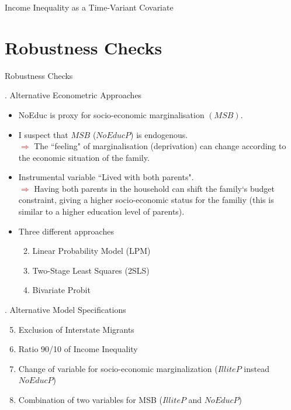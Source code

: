 \documentclass{beamer}
\begin{document}
\begin{frame}[label=Harmonsation]{Income Inequality as a Time-Variant Covariate}
\vspace{-0.5cm}	
\flushright \hyperlink{main5}{\beamerbutton{\textcolor{red}{Back to Presentation}}}
\end{frame}





\section{Robustness Checks}



\begin{frame}[label=Robustness]{Robustness Checks}
\begin{block}{. Alternative Econometric Approaches}
\begin{itemize}
		\item \footnotesize NoEduc is proxy for socio-economic marginalisation $(MSB)$.
		
		\item \footnotesize I suspect that $MSB$ ($NoEducP$) is endogenous. \\ \tiny \textcolor{red}{$\Longrightarrow$} The ``feeling" of marginalisation (deprivation) can change according to the economic situation of the family.
		
		\item \footnotesize Instrumental variable ``Lived with both parents". \\ \tiny\textcolor{red}{$\Longrightarrow$} Having both parents in the household can shift the family`s budget constraint, giving a higher socio-economic status for the familiy (this is similar to a higher education level of parents).
		
		\item \footnotesize Three different approaches
		\begin{enumerate}
		\setcounter{enumi}{1}
		\item \footnotesize Linear Probability Model (LPM)
		\item \footnotesize Two-Stage Least Squares (2SLS)
		\item \footnotesize Bivariate Probit
		\end{enumerate}
		
\end{itemize}
\end{block}


\begin{block}{. Alternative Model Specifications}
\begin{enumerate}
\setcounter{enumi}{4}
\item \footnotesize Exclusion of Interstate Migrants
\item \footnotesize Ratio 90/10 of Income Inequality
\item \footnotesize Change of variable for socio-economic marginalization ($IlliteP$ instead $NoEducP$)
\item \footnotesize Combination of two variables for MSB ($IlliteP$ and $NoEducP$)
\end{enumerate}
		\end{block}
\end{frame}
\end{document}

